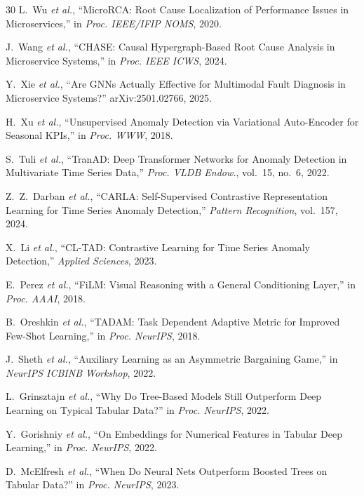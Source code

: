 \documentclass[12pt,a4paper]{report}
\begin{document}
\begin{thebibliography}{30}
L.~Wu \emph{et al.}, ``MicroRCA: Root Cause Localization of Performance Issues in Microservices,'' in \emph{Proc. IEEE/IFIP NOMS}, 2020.

J.~Wang \emph{et al.}, ``CHASE: Causal Hypergraph-Based Root Cause Analysis in Microservice Systems,'' in \emph{Proc. IEEE ICWS}, 2024.

Y.~Xie \emph{et al.}, ``Are GNNs Actually Effective for Multimodal Fault Diagnosis in Microservice Systems?'' arXiv:2501.02766, 2025.

H.~Xu \emph{et al.}, ``Unsupervised Anomaly Detection via Variational Auto-Encoder for Seasonal KPIs,'' in \emph{Proc. WWW}, 2018.

S.~Tuli \emph{et al.}, ``TranAD: Deep Transformer Networks for Anomaly Detection in Multivariate Time Series Data,'' \emph{Proc. VLDB Endow.}, vol.~15, no.~6, 2022.

Z.~Z.~Darban \emph{et al.}, ``CARLA: Self-Supervised Contrastive Representation Learning for Time Series Anomaly Detection,'' \emph{Pattern Recognition}, vol.~157, 2024.

X.~Li \emph{et al.}, ``CL-TAD: Contrastive Learning for Time Series Anomaly Detection,'' \emph{Applied Sciences}, 2023.

E.~Perez \emph{et al.}, ``FiLM: Visual Reasoning with a General Conditioning Layer,'' in \emph{Proc. AAAI}, 2018.

B.~Oreshkin \emph{et al.}, ``TADAM: Task Dependent Adaptive Metric for Improved Few-Shot Learning,'' in \emph{Proc. NeurIPS}, 2018.

J.~Sheth \emph{et al.}, ``Auxiliary Learning as an Asymmetric Bargaining Game,'' in \emph{NeurIPS ICBINB Workshop}, 2022.

L.~Grinsztajn \emph{et al.}, ``Why Do Tree-Based Models Still Outperform Deep Learning on Typical Tabular Data?'' in \emph{Proc. NeurIPS}, 2022.

Y.~Gorishniy \emph{et al.}, ``On Embeddings for Numerical Features in Tabular Deep Learning,'' in \emph{Proc. NeurIPS}, 2022.

D.~McElfresh \emph{et al.}, ``When Do Neural Nets Outperform Boosted Trees on Tabular Data?'' in \emph{Proc. NeurIPS}, 2023.


\end{thebibliography}
\end{document}
